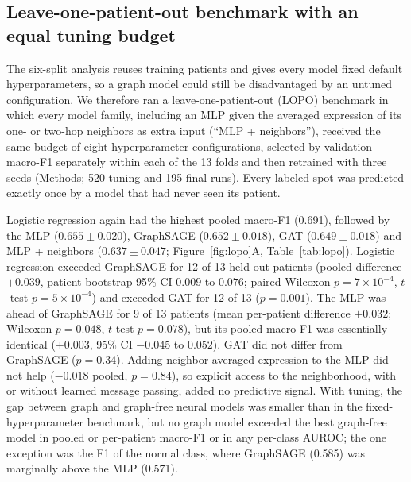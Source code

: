 \documentclass[11pt,letterpaper]{article}
\begin{document}
\subsection{Leave-one-patient-out benchmark with an equal tuning budget}

The six-split analysis reuses training patients and gives every model fixed default hyperparameters, so a graph model could still be disadvantaged by an untuned configuration. We therefore ran a leave-one-patient-out (LOPO) benchmark in which every model family, including an MLP given the averaged expression of its one- or two-hop neighbors as extra input (``MLP + neighbors''), received the same budget of eight hyperparameter configurations, selected by validation macro-F1 separately within each of the 13 folds and then retrained with three seeds (Methods; 520 tuning and 195 final runs). Every labeled spot was predicted exactly once by a model that had never seen its patient.

Logistic regression again had the highest pooled macro-F1 (0.691), followed by the MLP ($0.655 \pm 0.020$), GraphSAGE ($0.652 \pm 0.018$), GAT ($0.649 \pm 0.018$) and MLP + neighbors ($0.637 \pm 0.047$; Figure~\ref{fig:lopo}A, Table~\ref{tab:lopo}). Logistic regression exceeded GraphSAGE for 12 of 13 held-out patients (pooled difference $+0.039$, patient-bootstrap 95\% CI $0.009$ to $0.076$; paired Wilcoxon $p = 7 \times 10^{-4}$, $t$-test $p = 5 \times 10^{-4}$) and exceeded GAT for 12 of 13 ($p = 0.001$). The MLP was ahead of GraphSAGE for 9 of 13 patients (mean per-patient difference $+0.032$; Wilcoxon $p = 0.048$, $t$-test $p = 0.078$), but its pooled macro-F1 was essentially identical ($+0.003$, 95\% CI $-0.045$ to $0.052$). GAT did not differ from GraphSAGE ($p = 0.34$). Adding neighbor-averaged expression to the MLP did not help ($-0.018$ pooled, $p = 0.84$), so explicit access to the neighborhood, with or without learned message passing, added no predictive signal. With tuning, the gap between graph and graph-free neural models was smaller than in the fixed-hyperparameter benchmark, but no graph model exceeded the best graph-free model in pooled or per-patient macro-F1 or in any per-class AUROC; the one exception was the F1 of the normal class, where GraphSAGE (0.585) was marginally above the MLP (0.571).
\end{document}
